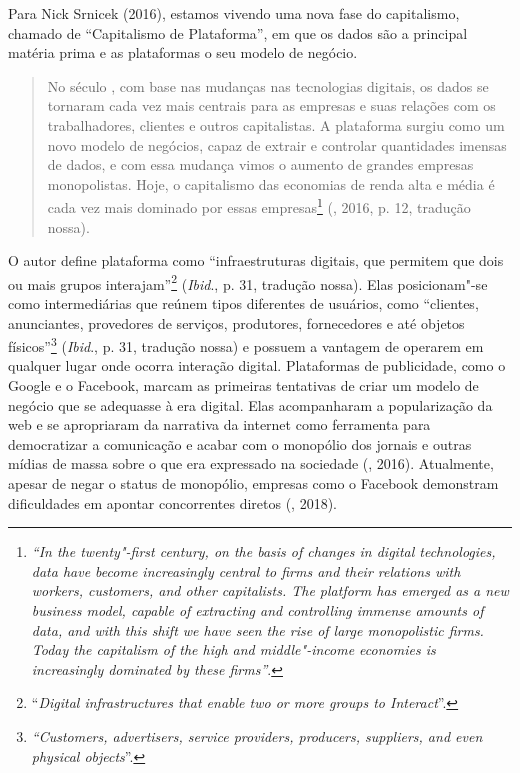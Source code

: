 Para Nick Srnicek (2016), estamos vivendo uma nova fase do capitalismo,
chamado de ``Capitalismo de Plataforma'', em que os dados são a
principal matéria prima e as plataformas o seu modelo de negócio.

\begin{quote}
No século , com base nas mudanças nas tecnologias digitais, os dados
se tornaram cada vez mais centrais para as empresas e suas relações com
os trabalhadores, clientes e outros capitalistas. A plataforma surgiu
como um novo modelo de negócios, capaz de extrair e controlar
quantidades imensas de dados, e com essa mudança vimos o aumento de
grandes empresas monopolistas. Hoje, o capitalismo das economias de
renda alta e média é cada vez mais dominado por essas empresas\footnote{\emph{``In
  the twenty"-first century, on the basis of changes in digital
  technologies, data have become increasingly central to firms and their
  relations with workers, customers, and other capitalists. The platform
  has emerged as a new business model, capable of extracting and
  controlling immense amounts of data, and with this shift we have seen
  the rise of large monopolistic firms. Today the capitalism of the high
  and middle"-income economies is increasingly dominated by these
  firms''}.} (, 2016, p. 12, tradução nossa).
\end{quote}

O autor define plataforma como ``infraestruturas digitais, que permitem
que dois ou mais grupos interajam''\footnote{``\emph{Digital infrastructures
  that enable two or more groups to Interact}''.} (\emph{Ibid}., p. 31, tradução
nossa). Elas posicionam"-se como intermediárias que reúnem tipos
diferentes de usuários, como ``clientes, anunciantes, provedores de
serviços, produtores, fornecedores e até objetos físicos''\footnote{\emph{``Customers,
  advertisers, service providers, producers, suppliers, and even
  physical objects}''.} (\emph{Ibid}., p. 31, tradução nossa) e possuem a vantagem
de operarem em qualquer lugar onde ocorra interação digital. Plataformas
de publicidade, como o Google e o Facebook, marcam as primeiras
tentativas de criar um modelo de negócio que se adequasse à era digital.
Elas acompanharam a popularização da web e se apropriaram da narrativa
da internet como ferramenta para democratizar a comunicação e acabar com
o monopólio dos jornais e outras mídias de massa sobre o que era
expressado na sociedade (, 2016). Atualmente, apesar de negar o
status de monopólio, empresas como o Facebook demonstram dificuldades em
apontar concorrentes diretos (, 2018).

